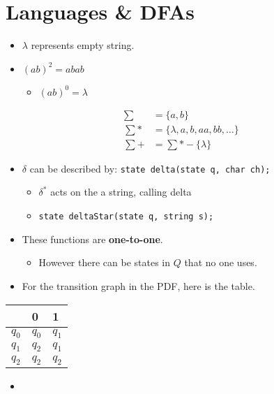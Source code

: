 \documentclass[12pt]{article}
\begin{document}
\section{Languages \& DFAs}

\begin{itemize}
    \item $\lambda$ represents empty string.
    \item $(ab)^2 = abab$
    \begin{itemize}
        \item $(ab)^0 = \lambda$
    \end{itemize}
\end{itemize}

\begin{align}
    \sum &= \{ a,b \} \\
    \sum* &= \{ \lambda, a, b, aa, bb, \ldots \} \\
    \sum+ &= \sum* - \{ \lambda \}
\end{align}

\begin{itemize}
    \item $\delta$ can be described by: \texttt{state delta(state q, char ch);}
    \begin{itemize}
        \item $\delta^*$ acts on the a string, calling delta
        \item \texttt{state deltaStar(state q, string s);}
    \end{itemize}

    \item These functions are \textbf{one-to-one}.
    \begin{itemize}
        \item However there can be states in $Q$ that no one uses.
    \end{itemize}

    \item For the transition graph in the PDF, here is the table.
\end{itemize}

\begin{center}
    \begin{tabular}{c|ll}
              & 0 & 1 \\ \hline
        $q_0$ & $q_0$ & $q_1$ \\
        $q_1$ & $q_2$ & $q_1$ \\
        $q_2$ & $q_2$& $q_2$ \\
    \end{tabular}
\end{center}

\begin{itemize}
    \item
\end{itemize}
\end{document}
